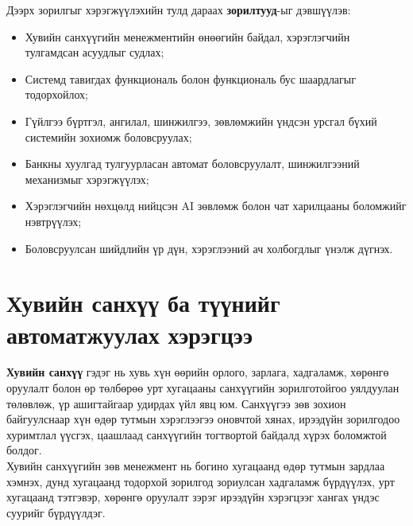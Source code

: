 Дээрх зорилгыг хэрэгжүүлэхийн тулд дараах \textbf{зорилтууд}-ыг дэвшүүлэв:
\begin{itemize}
    \item [1.] Хувийн санхүүгийн менежментийн өнөөгийн байдал, хэрэглэгчийн тулгамдсан асуудлыг судлах;
    \item [2.] Системд тавигдах функциональ болон функциональ бус шаардлагыг тодорхойлох;
    \item [3.] Гүйлгээ бүртгэл, ангилал, шинжилгээ, зөвлөмжийн үндсэн урсгал бүхий системийн зохиомж боловсруулах;
    \item [4.] Банкны хуулгад тулгуурласан автомат боловсруулалт, шинжилгээний механизмыг хэрэгжүүлэх;
    \item [5.] Хэрэглэгчийн нөхцөлд нийцсэн AI зөвлөмж болон чат харилцааны боломжийг нэвтрүүлэх;
    \item [6.] Боловсруулсан шийдлийн үр дүн, хэрэглээний ач холбогдлыг үнэлж дүгнэх.
\end{itemize}

\section{Хувийн санхүү ба түүнийг автоматжуулах хэрэгцээ}
\textbf{Хувийн санхүү} гэдэг нь хувь хүн өөрийн орлого, зарлага, хадгаламж, хөрөнгө оруулалт болон өр төлбөрөө урт хугацааны санхүүгийн зорилготойгоо уялдуулан төлөвлөж, үр ашигтайгаар удирдах үйл явц юм. Санхүүгээ зөв зохион байгуулснаар хүн өдөр тутмын хэрэглээгээ оновчтой хянах, ирээдүйн зорилгодоо хуримтлал үүсгэх, цаашлаад санхүүгийн тогтвортой байдалд хүрэх боломжтой болдог.\\

Хувийн санхүүгийн зөв менежмент нь богино хугацаанд өдөр тутмын зардлаа хэмнэх, дунд хугацаанд тодорхой зорилгод зориулсан хадгаламж бүрдүүлэх, урт хугацаанд тэтгэвэр, хөрөнгө оруулалт зэрэг ирээдүйн хэрэгцээг хангах үндэс суурийг бүрдүүлдэг.\\

